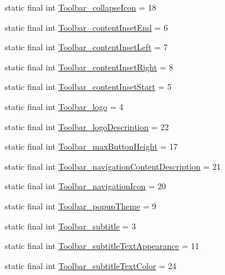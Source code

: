 \begin{DoxyCompactItemize}
static final int \hyperlink{classproject4_1_1xaria_1_1R_1_1styleable_a2cf454b5f11a8dc6f39c763c9a877b20}{Toolbar\+\_\+collapse\+Icon} = 18
\item 
static final int \hyperlink{classproject4_1_1xaria_1_1R_1_1styleable_a57f6aadbc973e24685a86eedaafd5f4c}{Toolbar\+\_\+content\+Inset\+End} = 6
\item 
static final int \hyperlink{classproject4_1_1xaria_1_1R_1_1styleable_a2660e1510b54665063d64211023b050f}{Toolbar\+\_\+content\+Inset\+Left} = 7
\item 
static final int \hyperlink{classproject4_1_1xaria_1_1R_1_1styleable_a52a6ed0d0c3dfe919f77ed1729daf3f9}{Toolbar\+\_\+content\+Inset\+Right} = 8
\item 
static final int \hyperlink{classproject4_1_1xaria_1_1R_1_1styleable_a9834196c2626e358f21cf55efd25f27c}{Toolbar\+\_\+content\+Inset\+Start} = 5
\item 
static final int \hyperlink{classproject4_1_1xaria_1_1R_1_1styleable_a56c0b377a7daf8828ad9a239006baaaf}{Toolbar\+\_\+logo} = 4
\item 
static final int \hyperlink{classproject4_1_1xaria_1_1R_1_1styleable_ac4c21d9b696d419fa766694469674d1f}{Toolbar\+\_\+logo\+Description} = 22
\item 
static final int \hyperlink{classproject4_1_1xaria_1_1R_1_1styleable_a737f7e13fbcddd0d8f2c90ce3066e375}{Toolbar\+\_\+max\+Button\+Height} = 17
\item 
static final int \hyperlink{classproject4_1_1xaria_1_1R_1_1styleable_a7ce219ac5cd9c8b9b55a133796302f54}{Toolbar\+\_\+navigation\+Content\+Description} = 21
\item 
static final int \hyperlink{classproject4_1_1xaria_1_1R_1_1styleable_a857db4b68c78808f5d7aff17e497b305}{Toolbar\+\_\+navigation\+Icon} = 20
\item 
static final int \hyperlink{classproject4_1_1xaria_1_1R_1_1styleable_ad04ed82b66818e311f872c158b0d6df5}{Toolbar\+\_\+popup\+Theme} = 9
\item 
static final int \hyperlink{classproject4_1_1xaria_1_1R_1_1styleable_ab72a989ed660ee062ccf0405ae356a90}{Toolbar\+\_\+subtitle} = 3
\item 
static final int \hyperlink{classproject4_1_1xaria_1_1R_1_1styleable_a4b938685d0218d8e307f8df758e2ca89}{Toolbar\+\_\+subtitle\+Text\+Appearance} = 11
\item 
static final int \hyperlink{classproject4_1_1xaria_1_1R_1_1styleable_af2caead52c870ae8c1443c261585491e}{Toolbar\+\_\+subtitle\+Text\+Color} = 24
\item 

\end{DoxyCompactItemize}
